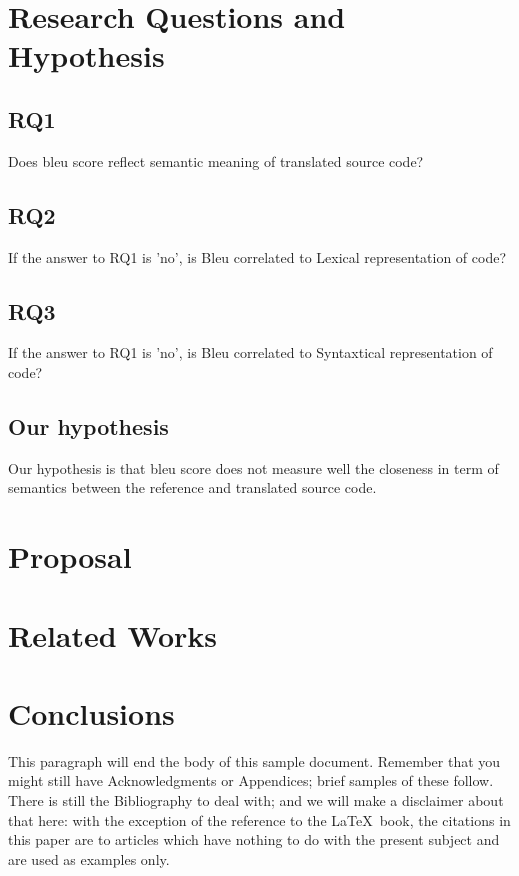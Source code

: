 \section{Research Questions and Hypothesis}
\subsection{RQ1}
Does bleu score reflect semantic meaning of translated source code?
\subsection{RQ2} 
If the answer to RQ1 is 'no', is Bleu correlated to Lexical representation of code?
\subsection{RQ3} 
If the answer to RQ1 is 'no', is Bleu correlated to Syntaxtical representation of code?
\subsection{Our hypothesis}
Our hypothesis is that bleu score does not measure well the closeness in term of semantics between the reference and translated source code. 



\section{Proposal}
\section{Related Works}

\section{Conclusions}
This paragraph will end the body of this sample document.
Remember that you might still have Acknowledgments or
Appendices; brief samples of these
follow.  There is still the Bibliography to deal with; and
we will make a disclaimer about that here: with the exception
of the reference to the \LaTeX\ book, the citations in
this paper are to articles which have nothing to
do with the present subject and are used as
examples only.



